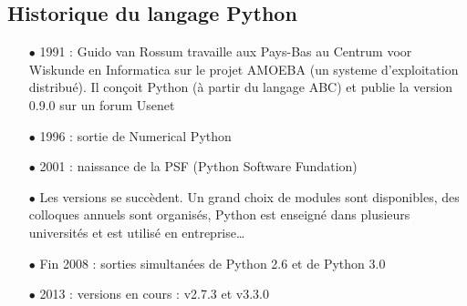 \subsection{Historique du langage Python}
\begin{itemize}
	
	\item [$\bullet$]1991 : Guido van Rossum travaille aux Pays-Bas au Centrum voor Wiskunde en Informatica  sur le projet AMOEBA (un systeme
d'exploitation distribué). Il conçoit Python (à partir du langage ABC) et publie la version 0.9.0 sur un forum Usenet
	\item [$\bullet$]1996 : sortie de Numerical Python
	\item [$\bullet$]2001 : naissance de la PSF (Python Software Fundation)
	\item [$\bullet$]Les versions se succèdent. Un grand choix de modules sont disponibles, des colloques annuels sont
organisés, Python est enseigné dans plusieurs universités et est utilisé en entreprise\dots
	\item [$\bullet$]Fin 2008 : sorties simultanées de Python 2.6 et de Python 3.0
	\item [$\bullet$]2013 : versions en cours : v2.7.3 et v3.3.0
\end{itemize}
